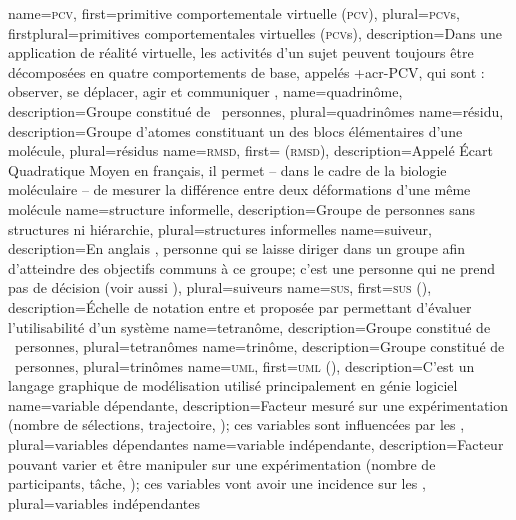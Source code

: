 %
{%
	name={\textsc{pcv}},
	first={primitive comportementale virtuelle (\textsc{pcv})},%
	plural={\textsc{pcv}s},%
	firstplural={primitives comportementales virtuelles (\textsc{pcv}s)},%
	description={Dans une application de réalité virtuelle, les activités d'un sujet peuvent toujours être décomposées en quatre comportements de base, appelés \myacro+{acr-PCV}, qui sont : observer, se déplacer, agir et communiquer },%
}
%
{%
	name={quadrinôme},%
	description={Groupe constitué de ~personnes},%
	plural={quadrinômes}%
}
%
{%
	name={résidu},%
	description={Groupe d'atomes constituant un des blocs élémentaires d'une molécule},%
	plural={résidus}%
}
%
{%
	name={\textsc{rmsd}},%
	first={ (\textsc{rmsd})},%
	description={Appelé Écart Quadratique Moyen en français, il permet -- dans le cadre de la biologie moléculaire -- de mesurer la différence entre deux déformations d'une même molécule}%
}
%
{%
	name={structure informelle},%
	description={Groupe de personnes sans structures ni hiérarchie},%
	plural={structures informelles}%
}
%
{%
	name={suiveur},%
	description={En anglais , personne qui se laisse diriger dans un groupe afin d'atteindre des objectifs communs à ce groupe; c'est une personne qui ne prend pas de décision (voir aussi )},%
	plural={suiveurs}%
}
%
{%
	name={\textsc{sus}},%
	first={\textsc{sus} ()},%
	description={Échelle de notation entre  et  proposée par  permettant d'évaluer l'utilisabilité d'un système}%
}
%
{%
	name={tetranôme},%
	description={Groupe constitué de ~personnes},%
	plural={tetranômes}%
}
%
{%
	name={trinôme},%
	description={Groupe constitué de ~personnes},%
	plural={trinômes}%
}
%
{%
	name={\textsc{uml}},%
	first={\textsc{uml} ()},%
	description={C'est un langage graphique de modélisation utilisé principalement en génie logiciel}%
}
%
{%
	name={variable dépendante},%
	description={Facteur mesuré sur une expérimentation (nombre de sélections, trajectoire, \myetc); ces variables sont influencées par les },%
	plural={variables dépendantes}%
}
%
{%
	name={variable indépendante},%
	description={Facteur pouvant varier et être manipuler sur une expérimentation (nombre de participants, tâche, \myetc); ces variables vont avoir une incidence sur les },%
	plural={variables indépendantes}%
}
